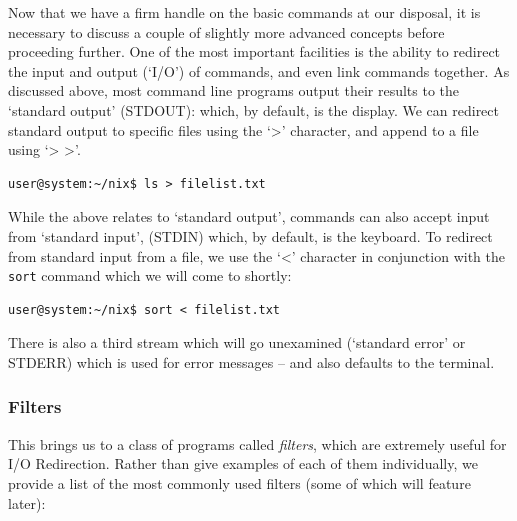 \documentclass[11pt]{article}
\begin{document}
Now that we have a firm handle on the basic commands at our disposal, it is necessary to discuss a couple of slightly more advanced concepts before proceeding further. One of the most important facilities is the ability to redirect the input and output (`I/O') of commands, and even link commands together. As discussed above, most command line programs output their results to the `standard output' (STDOUT): which, by default, is the display. We can redirect standard output to specific files using the `>' character, and append to a file using `> >'.\\

\begin{listing}[H]
\caption{>}\vspace{-0.1in}
\begin{verbatim}
user@system:~/nix$ ls > filelist.txt
\end{verbatim}
\end{listing}

While the above relates to `standard output', commands can also accept input from `standard input', (STDIN) which, by default, is the keyboard. To redirect from standard input from a file,  we use the `<' character in conjunction with the \texttt{sort} command which we will come to shortly: \\

\begin{listing}[H]
\caption{<}\vspace{-0.1in}
\begin{verbatim}
user@system:~/nix$ sort < filelist.txt
\end{verbatim}
\end{listing}

There is also a third stream which will go unexamined (`standard error' or STDERR) which is used for error messages -- and also defaults to the terminal.

\subsubsection{Filters}

This brings us to a class of programs called \emph{filters}, which are extremely useful for I/O Redirection. Rather than give examples of each of them individually, we provide a list of the most commonly used filters (some of which will feature later):
\end{document}
